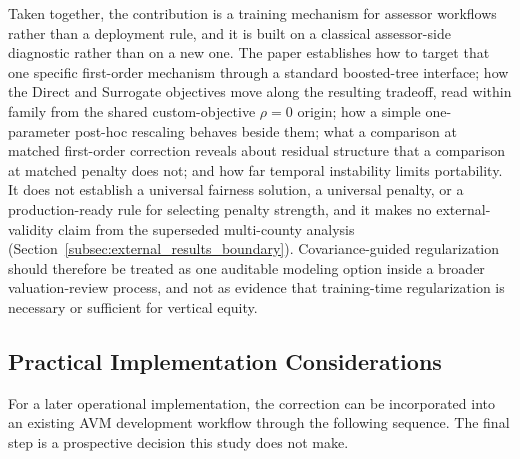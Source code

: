 \documentclass[10pt]{article}
\theoremstyle{definition}
\newcommand{\1}{\mathbf{1}}
\begin{document}
Taken together, the contribution is a training mechanism for assessor workflows
rather than a deployment rule, and it is built on a classical assessor-side diagnostic rather
than on a new one. The paper establishes how to target that one specific
first-order mechanism through a standard boosted-tree interface; how the Direct and Surrogate
objectives move along the resulting tradeoff, read within family from the shared custom-objective
$\rho=0$ origin; how a simple one-parameter post-hoc rescaling behaves beside them; what a
comparison at matched first-order correction reveals about residual structure that a comparison at
matched penalty does not; and how far temporal instability limits portability. It does not establish
a universal fairness solution, a universal penalty, or a production-ready rule for selecting penalty
strength, and it makes no external-validity claim from the superseded multi-county analysis
(Section~\ref{subsec:external_results_boundary}). Covariance-guided regularization should therefore
be treated as one auditable modeling option inside a broader valuation-review process, and not as
evidence that training-time regularization is necessary or sufficient for vertical equity.

\subsection{\texorpdfstring{
Practical Implementation Considerations}{Practical Implementation Considerations}}
\label{sec:implementation_workflow}

For a later operational implementation, the correction can be incorporated into an existing AVM development workflow through the following sequence. The final step is a prospective decision this study does not make.
\end{document}
